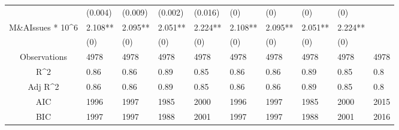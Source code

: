 \documentclass{article}
\begin{document}
\begin{table}[H]
\begin{tabular}{|clllllllll|}
   & (0.004) & (0.009) & (0.002) & (0.016) & (0) & (0) & (0) & (0) &  \\ 
  M\&AIssues * 10^6 & 2.108** & 2.095** & 2.051** & 2.224** & 2.108** & 2.095** & 2.051** & 2.224** &  \\ 
   & (0) & (0) & (0) & (0) & (0) & (0) & (0) & (0) &  \\ 
  \hline 
 Observations & 4978 & 4978 & 4978 & 4978 & 4978 & 4978 & 4978 & 4978 & 4978 \\ 
  R^2 & 0.86 & 0.86 & 0.89 & 0.85 & 0.86 & 0.86 & 0.89 & 0.85 & 0.8 \\ 
  Adj R^2 & 0.86 & 0.86 & 0.89 & 0.85 & 0.86 & 0.86 & 0.89 & 0.85 & 0.8 \\ 
  AIC & 1996 & 1997 & 1985 & 2000 & 1996 & 1997 & 1985 & 2000 & 2015 \\ 
  BIC & 1997 & 1997 & 1988 & 2001 & 1997 & 1997 & 1988 & 2001 & 2016 \\ 
   \hline
\end{tabular}
 
\end{table}
\end{document}

